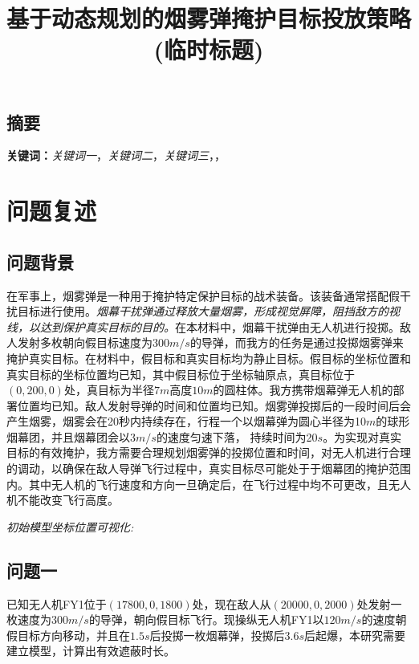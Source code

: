 \documentclass{article}
\title{\large 基于动态规划的烟雾弹掩护目标投放策略(临时标题)}
\date{}
\begin{document}
\maketitle
\begin{center}
\section*{摘要}
\end{center}
\vspace{-1em}


\noindent


\noindent
\textbf{关键词：}\textit{关键词一}，\textit{关键词二}，\textit{关键词三}，\textit{}，\textit{}



\section{问题复述}

\subsection{问题背景}

在军事上，烟雾弹是一种用于掩护特定保护目标的战术装备。该装备通常搭配假干扰目标进行使用。\textit{烟幕干扰弹通过释放大量烟雾，形成视觉屏障，阻挡敌方的视线，以达到保护真实目标的目的。}在本材料中，烟幕干扰弹由无人机进行投掷。敌人发射多枚朝向假目标速度为$300m/s$的导弹，而我方的任务是通过投掷烟雾弹来掩护真实目标。在材料中，假目标和真实目标均为静止目标。假目标的坐标位置和真实目标的坐标位置均已知，其中假目标位于坐标轴原点，真目标位于$(0,200,0)$处，真目标为半径$7m$高度$10m$的圆柱体。我方携带烟幕弹无人机的部署位置均已知。敌人发射导弹的时间和位置均已知。烟雾弹投掷后的一段时间后会产生烟雾，烟雾会在20秒内持续存在，行程一个以烟幕弹为圆心半径为10$m$的球形烟幕团，并且烟幕团会以$3 m/s$的速度匀速下落，
持续时间为20$s$。为实现对真实目标的有效掩护，我方需要合理规划烟雾弹的投掷位置和时间，对无人机进行合理的调动，以确保在敌人导弹飞行过程中，真实目标尽可能处于于烟幕团的掩护范围内。其中无人机的飞行速度和方向一旦确定后，在飞行过程中均不可更改，且无人机不能改变飞行高度。

\textit{初始模型坐标位置可视化:}

\subsection{问题一}

已知无人机FY1位于$(17800,0,1800)$处，现在敌人从$(20000,0,2000)$处发射一枚速度为$300m/s$的导弹，朝向假目标飞行。现操纵无人机FY1以$120m/s$的速度朝假目标方向移动，并且在$1.5s$后投掷一枚烟幕弹，投掷后$3.6s$后起爆，本研究需要建立模型，计算出有效遮蔽时长。
\end{document}
